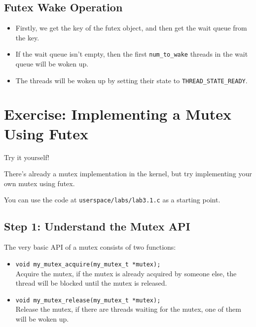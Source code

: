 \subsection{Futex Wake Operation}

\begin{itemize}
    \item Firstly, we get the key of the futex object, and then get the wait queue
          from the key.
    \item If the wait queue isn't empty, then the first \texttt{num\_to\_wake} threads
          in the wait queue will be woken up.
    \item The threads will be woken up by setting their state to \texttt{THREAD\_STATE\_READY}.
\end{itemize}

\section*{Exercise: Implementing a Mutex Using Futex}

\begin{exercise*}{Try it yourself!}
    \item There's already a mutex implementation in the kernel, but try implementing
    your own mutex using futex.
    \item You can use the code at \texttt{userspace/labs/lab3.1.c} as a starting point.
\end{exercise*}

\subsection{Step 1: Understand the Mutex API}

The very basic API of a mutex consists of two functions:

\begin{itemize}
    \item \texttt{void my\_mutex\_acquire(my\_mutex\_t *mutex);} \\
          Acquire the mutex, if the mutex is already acquired by someone else, the
          thread will be blocked until the mutex is released.
    \item \texttt{void my\_mutex\_release(my\_mutex\_t *mutex);} \\
          Release the mutex, if there are threads waiting for the mutex, one of them
          will be woken up.
\end{itemize}

